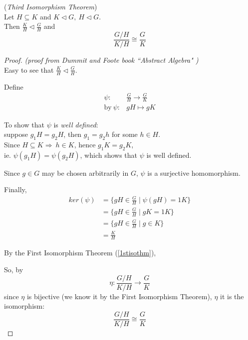 \documentclass{article}
\theoremstyle{definition}
\newenvironment{thm}[1]
{\renewcommand\theinnerthm{#1}\innerthm}
{\endinnerthm}
\begin{document}
\begin{thm}{}(\emph{Third Isomorphism Theorem}) \label{2ndisothm}\\
  Let $H \subseteq K$ and $K \triangleleft G,~ H \triangleleft G$.\\
  Then
  $\frac{K}{H} \triangleleft \frac{G}{H}$
  and
  $$\frac{ G/H }{ K/H } \cong \frac{G}{K}$$
\end{thm}
\begin{proof}
  \emph{(proof from Dummit and Foote book ``Abstract Algebra" \cite{dummitfoote})}\\

  Easy to see that $\frac{K}{H} \triangleleft \frac{G}{H}$.

  Define
      \begin{align*}
	\psi: &\frac{G}{H} \longrightarrow \frac{G}{K}\\
	\text{by}~ \psi: &gH \longmapsto gK
      \end{align*}

  To show that $\psi$ is \emph{well defined}:\\
  suppose $g_1 H = g_2 H$, then $g_1 = g_2 h$ for some $h \in H$.\\
  Since $H \subseteq K \Longrightarrow~ h \in K$, hence $g_1 K = g_2 K$,\\
  ie. $\psi(g_1 H) = \psi(g_2 H)$, which shows that $\psi$ is well defined.

  Since $g \in G$ may be chosen arbitrarily in $G$, $\psi$ is a surjective homomorphism.


  Finally,
  \begin{align*}
    ker(\psi) &= \{ gH \in \frac{G}{H} \mid \psi(gH)=1K \}\\
    &= \{ gH \in \frac{G}{H} \mid gK =1K \}\\
    &= \{ gH \in \frac{G}{H} \mid g \in K \}\\
    &= \frac{K}{H}
  \end{align*}


  By the First Isomorphism Theorem (\ref{1stisothm}),


  So, by
  $$\eta: \frac{G/H}{K/H} \longrightarrow \frac{G}{K}$$
  since $\eta$ is
  bijective (we know it by the First Isomorphism Theorem), $\eta$ it is the isomorphism:
  $$\frac{ G/H }{ K/H } \cong \frac{G}{K}$$


\end{proof}
\end{document}
